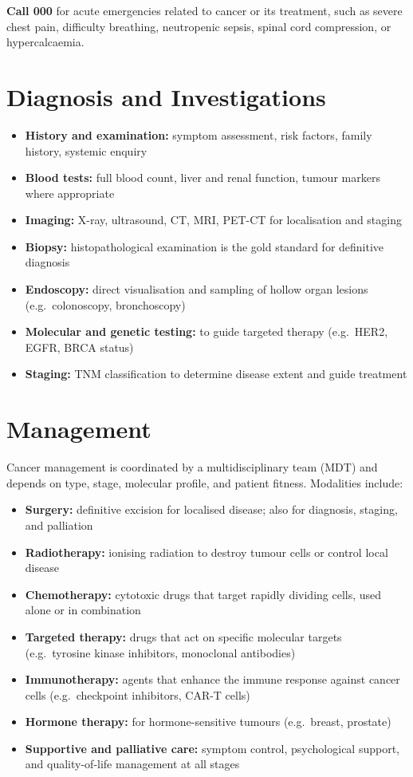 \textbf{Call 000} for acute emergencies related to cancer or its treatment, such as severe chest pain, difficulty breathing, neutropenic sepsis, spinal cord compression, or hypercalcaemia.

\section*{Diagnosis and Investigations}
\begin{itemize}
    \item \textbf{History and examination:} symptom assessment, risk factors, family history, systemic enquiry
    \item \textbf{Blood tests:} full blood count, liver and renal function, tumour markers where appropriate
    \item \textbf{Imaging:} X-ray, ultrasound, CT, MRI, PET-CT for localisation and staging
    \item \textbf{Biopsy:} histopathological examination is the gold standard for definitive diagnosis
    \item \textbf{Endoscopy:} direct visualisation and sampling of hollow organ lesions (e.g.\ colonoscopy, bronchoscopy)
    \item \textbf{Molecular and genetic testing:} to guide targeted therapy (e.g.\ HER2, EGFR, BRCA status)
    \item \textbf{Staging:} TNM classification to determine disease extent and guide treatment
\end{itemize}

\section*{Management}
Cancer management is coordinated by a multidisciplinary team (MDT) and depends on type, stage, molecular profile, and patient fitness. Modalities include:

\begin{itemize}
    \item \textbf{Surgery:} definitive excision for localised disease; also for diagnosis, staging, and palliation
    \item \textbf{Radiotherapy:} ionising radiation to destroy tumour cells or control local disease
    \item \textbf{Chemotherapy:} cytotoxic drugs that target rapidly dividing cells, used alone or in combination
    \item \textbf{Targeted therapy:} drugs that act on specific molecular targets (e.g.\ tyrosine kinase inhibitors, monoclonal antibodies)
    \item \textbf{Immunotherapy:} agents that enhance the immune response against cancer cells (e.g.\ checkpoint inhibitors, CAR-T cells)
    \item \textbf{Hormone therapy:} for hormone-sensitive tumours (e.g.\ breast, prostate)
    \item \textbf{Supportive and palliative care:} symptom control, psychological support, and quality-of-life management at all stages
\end{itemize}

